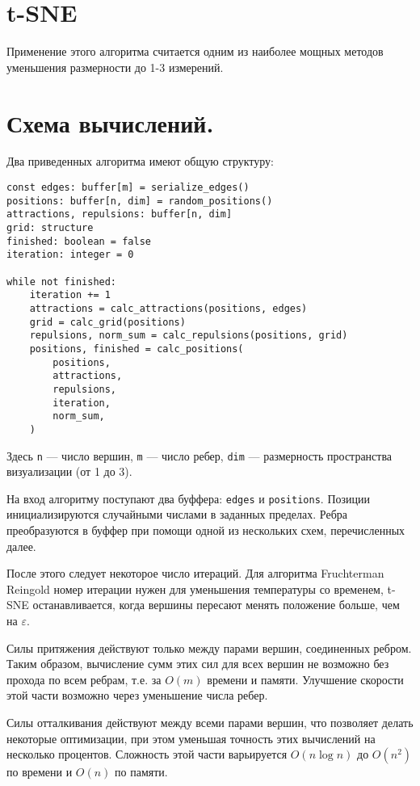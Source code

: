 \section{t-SNE}

Применение этого алгоритма считается одним из наиболее мощных методов уменьшения размерности до 1-3 измерений.

\section{Схема вычислений.}

Два приведенных алгоритма имеют общую структуру:

\begin{verbatim}
const edges: buffer[m] = serialize_edges()
positions: buffer[n, dim] = random_positions()
attractions, repulsions: buffer[n, dim]
grid: structure
finished: boolean = false
iteration: integer = 0

while not finished:
    iteration += 1
    attractions = calc_attractions(positions, edges)
    grid = calc_grid(positions)
    repulsions, norm_sum = calc_repulsions(positions, grid)
    positions, finished = calc_positions(
        positions,
        attractions,
        repulsions,
        iteration,
        norm_sum,
    )
\end{verbatim}

Здесь \texttt{n} --- число вершин, \texttt{m} --- число ребер, \texttt{dim} --- размерность пространства визуализации (от 1 до 3).

На вход алгоритму поступают два буффера: \texttt{edges} и \texttt{positions}. Позиции инициализируются случайными числами в заданных пределах. Ребра преобразуются в буффер при помощи одной из нескольких схем, перечисленных далее.

После этого следует некоторое число итераций. Для алгоритма Fruchterman Reingold номер итерации нужен для уменьшения температуры со временем, t-SNE останавливается, когда вершины пересают менять положение больше, чем на $\varepsilon$.

Силы притяжения действуют только между парами вершин, соединенных ребром. Таким образом, вычисление сумм этих сил для всех вершин не возможно без прохода по всем ребрам, т.е. за $O(m)$ времени и памяти. Улучшение скорости этой части возможно через уменьшение числа ребер.

Силы отталкивания действуют между всеми парами вершин, что позволяет делать некоторые оптимизации, при этом уменьшая точность этих вычислений на несколько процентов. Сложность этой части варьируется $O(n\log n)$ до $O(n^2)$ по времени и $O(n)$ по памяти.

